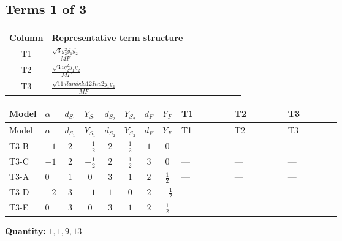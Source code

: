 \documentclass[8pt]{article}
\begin{document}
\begin{landscape}
\subsection*{Terms 1 of 3}
\begin{center}
\begin{tabular}{@{}c >{\raggedright\arraybackslash}p{0.82\linewidth}@{}}
\toprule
Column & Representative term structure \\
\midrule
T1 & \(\displaystyle \frac{\sqrt{3} g_{2}^{2} \overline{y_{1}} \overline{y_{2}}}{MF}\) \\
\midrule
T2 & \(\displaystyle \frac{\sqrt{3} i g_{2}^{2} \overline{y_{1}} \overline{y_{2}}}{MF}\) \\
\midrule
T3 & \(\displaystyle \frac{\sqrt{11} i lambda12Inv2 \overline{y_{1}} \overline{y_{2}}}{MF}\) \\
\midrule
\bottomrule
\end{tabular}
\end{center}
\smallskip
\tiny
\begin{longtable}{@{}llcccccc >{\raggedright\arraybackslash}p{0.21\linewidth} >{\raggedright\arraybackslash}p{0.21\linewidth} >{\raggedright\arraybackslash}p{0.21\linewidth}@{}}
\toprule
Model & $\alpha$ & $d_{S_1}$ & $Y_{S_1}$ & $d_{S_2}$ & $Y_{S_2}$ & $d_F$ & $Y_F$ & T1 & T2 & T3 \\
\midrule
\endfirsthead
\toprule
Model & $\alpha$ & $d_{S_1}$ & $Y_{S_1}$ & $d_{S_2}$ & $Y_{S_2}$ & $d_F$ & $Y_F$ & T1 & T2 & T3 \\
\midrule
\endhead
T3-B & $-1$ & $2$ & $-\frac{1}{2}$ & $2$ & $\frac{1}{2}$ & $1$ & $0$ & --- & --- & --- \\
\midrule
T3-C & $-1$ & $2$ & $-\frac{1}{2}$ & $2$ & $\frac{1}{2}$ & $3$ & $0$ & --- & --- & --- \\
\midrule
T3-A & $0$ & $1$ & $0$ & $3$ & $1$ & $2$ & $\frac{1}{2}$ & --- & --- & --- \\
\midrule
T3-D & $-2$ & $3$ & $-1$ & $1$ & $0$ & $2$ & $-\frac{1}{2}$ & --- & --- & --- \\
\midrule
T3-E & $0$ & $3$ & $0$ & $3$ & $1$ & $2$ & $\frac{1}{2}$ & \scriptsize\adjustbox{max width=\linewidth}{$\begin{gathered} - \frac{\sqrt{3} g_{2}^{2} \overline{y_{1}} \overline{y_{2}}}{6 MF}\end{gathered}$} & \scriptsize\adjustbox{max width=\linewidth}{$\begin{gathered} - \frac{49 \sqrt{3} i g_{2}^{2} \overline{y_{1}} \overline{y_{2}}}{24 MF}\end{gathered}$} & \scriptsize\adjustbox{max width=\linewidth}{$\begin{gathered} - \frac{3 \sqrt{11} i lambda12Inv2 \overline{y_{1}} \overline{y_{2}}}{22 MF}\end{gathered}$} \\
\midrule
\bottomrule
\end{longtable}
\clearpage
\noindent\textbf{Quantity: }$\mathrm{1,1,9,13}$\par\smallskip

\end{landscape}
\end{document}
